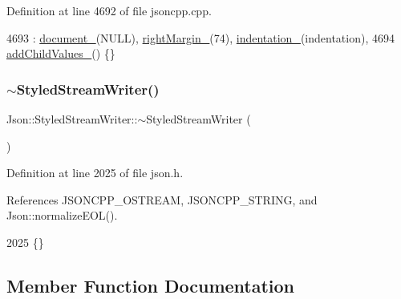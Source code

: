 Definition at line 4692 of file jsoncpp.\+cpp.


\begin{DoxyCode}
4693     : \hyperlink{class_json_1_1_styled_stream_writer_aa8c4e4576f5c3dcb10955d133a092dd6}{document\_}(NULL), \hyperlink{class_json_1_1_styled_stream_writer_a94299ec0a9bb925b2dbbab7c1f2b390a}{rightMargin\_}(74), \hyperlink{class_json_1_1_styled_stream_writer_aa45d8fb4ca82d0550be9042012303713}{indentation\_}(indentation),
4694       \hyperlink{class_json_1_1_styled_stream_writer_a4e4bb7fc223b2652b72b523b1ce414fa}{addChildValues\_}() \{\}
\end{DoxyCode}
\mbox{\label{class_json_1_1_styled_stream_writer_a17444a59f617970279714e97b0ddfa46}} 
\subsubsection{\texorpdfstring{$\sim$\+Styled\+Stream\+Writer()}{~StyledStreamWriter()}}
{\footnotesize\ttfamily Json\+::\+Styled\+Stream\+Writer\+::$\sim$\+Styled\+Stream\+Writer (\begin{DoxyParamCaption}{ }\end{DoxyParamCaption})\hspace{0.3cm}{\ttfamily [inline]}}



Definition at line 2025 of file json.\+h.



References J\+S\+O\+N\+C\+P\+P\+\_\+\+O\+S\+T\+R\+E\+AM, J\+S\+O\+N\+C\+P\+P\+\_\+\+S\+T\+R\+I\+NG, and Json\+::normalize\+E\+O\+L().


\begin{DoxyCode}
2025 \{\}
\end{DoxyCode}


\subsection{Member Function Documentation}
\mbox{\label{class_json_1_1_styled_stream_writer_ad2892f57171919fa4f8a5ae5574755cf}} 
